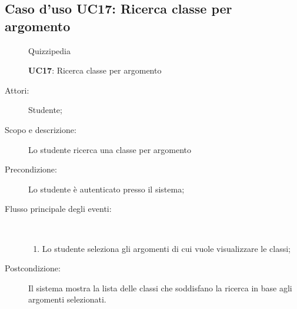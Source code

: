 \subsection{Caso d'uso UC17: Ricerca classe per argomento}
	\begin{figure}[H]
		\centering
		\begin{resizedtikzpicture}{\textwidth}
		\begin{umlsystem}[x=0, fill=lightgray!20]{Quizzipedia}
		\end{umlsystem}
		\end{resizedtikzpicture}
		\caption{\textbf{UC17}: Ricerca classe per argomento}
		\label{UC17}
	\end{figure}
\begin{description}
\item[Attori:] Studente;
\item[Scopo e descrizione:] Lo studente ricerca una classe per argomento
      \item[Precondizione:] Lo studente è autenticato presso il sistema;

        \item[Flusso principale degli eventi:] \ 
 \begin{enumerate}
          \item Lo studente seleziona gli argomenti di cui vuole visualizzare le classi;

      \end{enumerate}
    \item[Postcondizione:] Il sistema mostra la lista delle classi che soddisfano la ricerca in base agli argomenti selezionati.
  \end{description}
\hypertarget{UC18}{}
